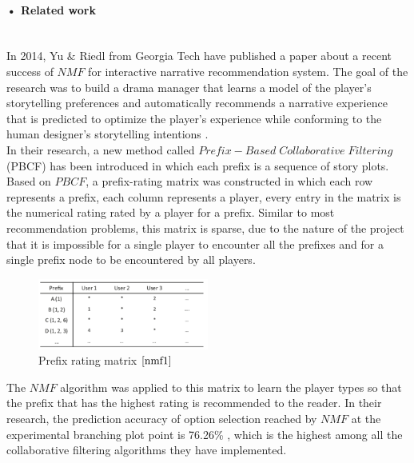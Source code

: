 \documentclass[11pt]{article} %
\begin{document}
\paragraph{• Related work}\mbox{}\\
In 2014, Yu $\&$ Riedl from Georgia Tech have published a paper\cite{nmf1} about a recent success of $NMF$ for interactive narrative recommendation system. The goal of the research was to build a drama manager that learns a model of the player's storytelling preferences and automatically recommends a narrative experience that is predicted to optimize the player's experience while conforming to the human designer's storytelling intentions \cite[p.~1]{nmf1}.\\
In their research, a new method called $Prefix-Based\;Collaborative\;Filtering$ (PBCF) \cite[p.~2]{nmf1} has been introduced in which each prefix is a sequence of story plots. Based on $PBCF$, a prefix-rating matrix was constructed in which each row represents a prefix, each column represents a player, every entry in the matrix is the numerical rating rated by a player for a prefix. Similar to most recommendation problems, this matrix is sparse, due to the nature of the project that it is impossible for a single player to encounter all the prefixes and for a single prefix node to be encountered by all players.
\begin{figure}[H]
\caption{Prefix rating matrix $\cite[p.~4]{nmf1}$}
\centering
\includegraphics[width=0.5\textwidth]{prefixrating}
\end{figure}
The $NMF$ algorithm was applied to this matrix to learn the player types so that the prefix that has the highest rating is recommended to the reader. In their research, the prediction accuracy of option selection reached by $NMF$ at the experimental branching plot point is 76.26\% \citep[p.14]{nmf1}, which is the highest among all the collaborative filtering algorithms they have implemented.
\end{document}
